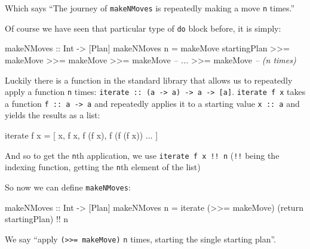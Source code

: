 \documentclass[]{article}
\newenvironment{Shaded}{}{}
\newcommand{\DataTypeTok}[1]{\textcolor[rgb]{0.56,0.13,0.00}{{#1}}}
\newcommand{\CommentTok}[1]{\textcolor[rgb]{0.38,0.63,0.69}{\textit{{#1}}}}
\newcommand{\OtherTok}[1]{\textcolor[rgb]{0.00,0.44,0.13}{{#1}}}
\newcommand{\FunctionTok}[1]{\textcolor[rgb]{0.02,0.16,0.49}{{#1}}}
\newcommand{\NormalTok}[1]{{#1}}
\begin{document}
Which says ``The journey of \texttt{makeNMoves} is repeatedly making a move
\texttt{n} times.''

Of course we have seen that particular type of \texttt{do} block before, it is
simply:

\begin{Shaded}
\begin{Highlighting}[]
\OtherTok{makeNMoves ::} \DataTypeTok{Int} \OtherTok{->} \NormalTok{[}\DataTypeTok{Plan}\NormalTok{]}
\NormalTok{makeNMoves n }\FunctionTok{=}
    \NormalTok{makeMove startingPlan }\FunctionTok{>>=} \NormalTok{makeMove}
        \FunctionTok{>>=} \NormalTok{makeMove }\FunctionTok{>>=} \NormalTok{makeMove   }\CommentTok{-- ...}
        \FunctionTok{>>=} \NormalTok{makeMove                }\CommentTok{-- (n times)}
\end{Highlighting}
\end{Shaded}

Luckily there is a function in the standard library that allows us to repeatedly
apply a function \texttt{n} times:
\texttt{iterate\ ::\ (a\ -\textgreater{}\ a)\ -\textgreater{}\ a\ -\textgreater{}\ {[}a{]}}.
\texttt{iterate\ f\ x} takes a function \texttt{f\ ::\ a\ -\textgreater{}\ a}
and repeatedly applies it to a starting value \texttt{x\ ::\ a} and yields the
results as a list:

\begin{Shaded}
\begin{Highlighting}[]
\NormalTok{iterate f x }\FunctionTok{=} \NormalTok{[ x, f x, f (f x), f (f (f x)) }\FunctionTok{...} \NormalTok{]}
\end{Highlighting}
\end{Shaded}

And so to get the \texttt{n}th application, we use \texttt{iterate\ f\ x\ !!\ n}
(\texttt{!!} being the indexing function, getting the \texttt{n}th element of
the list)

So now we can define \texttt{makeNMoves}:

\begin{Shaded}
\begin{Highlighting}[]
\OtherTok{makeNMoves ::} \DataTypeTok{Int} \OtherTok{->} \NormalTok{[}\DataTypeTok{Plan}\NormalTok{]}
\NormalTok{makeNMoves n }\FunctionTok{=} \NormalTok{iterate (}\FunctionTok{>>=} \NormalTok{makeMove) (return startingPlan) }\FunctionTok{!!} \NormalTok{n}
\end{Highlighting}
\end{Shaded}

We say ``apply \texttt{(\textgreater{}\textgreater{}=\ makeMove)} \texttt{n}
times, starting the single starting plan''.
\end{document}

